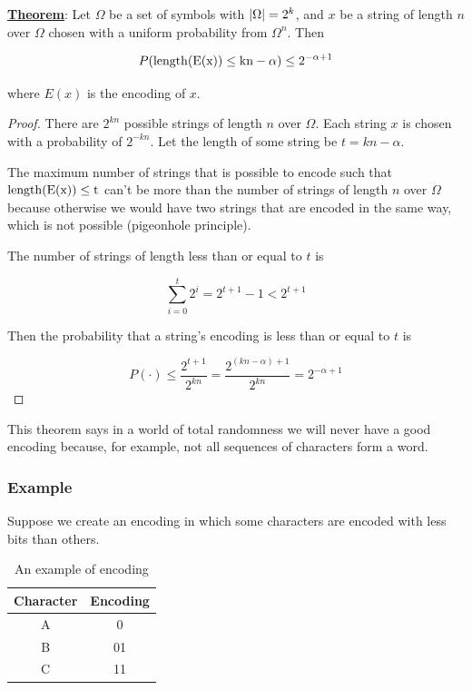 \documentclass[12pt]{extarticle}
\begin{document}
\textbf{\underline{Theorem}}: Let $\Omega$ be a set of symbols with $\abs{\Omega} = 2^k$, and $x$ be a string of length $n$ over $\Omega$ chosen with a uniform probability from $\Omega^n$.
Then

$$
    P(\operatorfont{length}(E(x)) \leq kn - \alpha) \leq 2^{-\alpha +1}
$$

where $E(x)$ is the encoding of $x$.

\begin{proof}
    There are $2^{kn}$ possible strings of length $n$ over $\Omega$. Each string $x$ is chosen with a probability of $2^{-kn}$.
    Let the length of some string be $t = kn - \alpha$.

    The maximum number of strings that is possible to encode such that $\operatorfont{length}(E(x)) \leq t$ can't be more than the number of strings of length $n$ over $\Omega$ because otherwise we would have two strings that are encoded in the same way, which is not possible (pigeonhole principle).

    The number of strings of length less than or equal to $t$ is

    $$
        \sum_{i=0}^{t} 2^{i} = 2^{t+1} - 1 < 2^{t+1}
    $$

    Then the probability that a string's encoding is less than or equal to $t$ is

    $$
        P(\cdot) \leq \frac{2^{t+1}}{2^{kn}} = \frac{2^{(kn - \alpha) + 1}}{2^{kn}} = 2^{-\alpha + 1}
    $$
\end{proof}

This theorem says in a world of total randomness we will never have a good encoding because, for example, not all sequences of characters form a word.

\subsubsection{Example}

Suppose we create an encoding in which some characters are encoded with less bits than others.

\begin{table}[H]
    \centering
    \begin{tabular}{ |c|c| }
        \hline
        \textbf{Character} & \textbf{Encoding} \\
        \hline
        A                  & 0                 \\
        B                  & 01                \\
        C                  & 11                \\
        \hline
    \end{tabular}
    \caption{An example of encoding}
    \label{tab:encoding_example}
\end{table}
\end{document}

